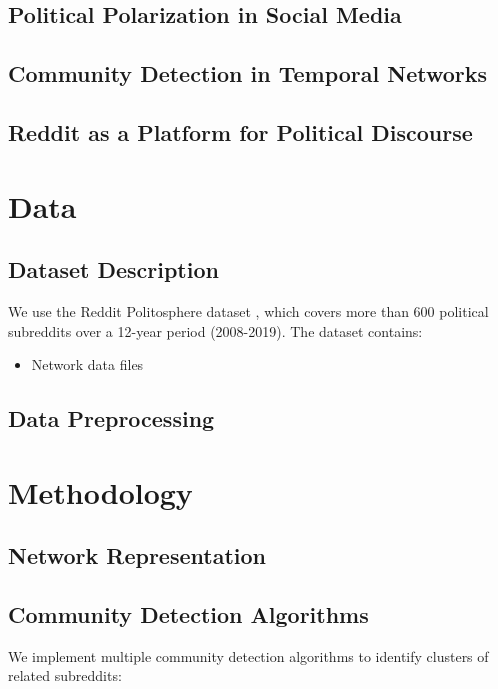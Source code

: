 \documentclass{article}
\begin{document}
\subsection{Political Polarization in Social Media}

\subsection{Community Detection in Temporal Networks}

\subsection{Reddit as a Platform for Political Discourse}

\section{Data}
\subsection{Dataset Description}
We use the Reddit Politosphere dataset \cite{Hofmann_Schütze_Pierrehumbert_2022}, which covers more than 600 political subreddits over a 12-year period (2008-2019). The dataset contains:
\begin{itemize}
    \item Network data files 
\end{itemize}

\subsection{Data Preprocessing}

\section{Methodology}
\subsection{Network Representation}

\subsection{Community Detection Algorithms}
We implement multiple community detection algorithms to identify clusters of related subreddits:
\end{document}
